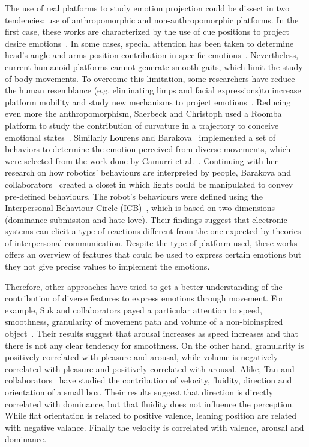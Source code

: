 The use of real platforms to study emotion projection could be dissect in two tendencies: use of anthropomorphic and non-anthropomorphic platforms. In the first case, these works are characterized by the use of cue positions to project desire emotions~\cite{NAO2013}. In some cases, special attention has been taken to determine head's angle and arms position contribution in specific emotions~\cite{Brown2014}. 
Nevertheless, current humanoid platforms cannot generate smooth gaits, which limit the study of body movements. To overcome this limitation, some researchers have reduce the human resemblance (e.g. eliminating limps and facial expressions)to increase platform mobility and study new mechanisms to project emotions~\cite{Arras2012}. Reducing even more the anthropomorphism, Saerbeck and Christoph used a Roomba platform to study the contribution of curvature in a trajectory to conceive emotional states~\cite{Saerbeck2010}. Similarly Lourens and Barakova~\cite{BarakovaL10} implemented a set of behaviors to determine the emotion  perceived from diverse movements, which were selected from the  work done by Camurri et al.~\cite{pop00002}. Continuing with her research on how robotics' behaviours are interpreted by people, Barakova and collaborators~\cite{Barakova2013} created a closet in which lights could be manipulated to convey pre-defined behaviours. The robot's behaviours were defined using the Interpersonal Behaviour Circle (ICB)~\cite{Leary57}, which is based on two dimensions (dominance-submission and hate-love). Their findings suggest that electronic systems can elicit a type of reactions different from the one expected by theories of interpersonal communication. Despite the type of platform used, these works offers an overview of features that could be used to express certain emotions but they not give precise values to implement the emotions.

Therefore, other approaches have tried to get a better understanding of the contribution of diverse features to express emotions through movement. For example, Suk and collaborators payed a particular attention to speed, smoothness, granularity of movement path and volume of a non-bioinspired object~\cite{NAM2014}. Their results suggest that arousal increases as speed increases and that there is not any clear tendency for smoothness. On the other hand, granularity is positively correlated with pleasure and arousal, while volume is negatively correlated with pleasure and positively correlated with arousal. Alike, Tan and collaborators~\cite{Tan2016} have studied the contribution of velocity, fluidity, direction and orientation of a small box. Their results suggest that direction is directly correlated with dominance, but that fluidity does not influence the perception. While flat orientation is related to positive valence, leaning position are related with negative valance. Finally the velocity is correlated with valence, arousal and dominance.  

